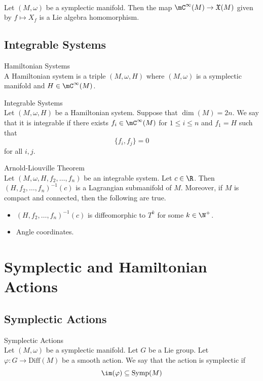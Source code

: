 \documentclass[a4paper]{article}
\begin{document}
\begin{prp}{}{}\\
Let $(M,\omega)$ be a symplectic manifold. Then the map $\mC^\infty(M)\to\mathfrak{X}(M)$ given by $f\mapsto X_f$ is a Lie algebra homomorphism. 
\end{prp}

\subsection{Integrable Systems}
\begin{defn}{Hamiltonian Systems}{}\\
A Hamiltonian system is a triple $(M,\omega,H)$ where $(M,\omega)$ is a symplectic manifold and $H\in\mC^\infty(M)$. 
\end{defn}

\begin{defn}{Integrable Systems}{}\\
Let $(M,\omega,H)$ be a Hamiltonian system. Suppose that $\dim(M)=2n$. We say that it is integrable if there exists $f_i\in\mC^\infty(M)$ for $1\leq i\leq n$ and $f_1=H$ such that $$\{f_i,f_j\}=0$$ for all $i,j$. 
\end{defn}

\begin{thm}{Arnold-Liouville Theorem}{}\\
Let $(M,\omega,H,f_2,\dots,f_n)$ be an integrable system. Let $c\in\R$. Then $(H,f_2,\dots,f_n)^{-1}(c)$ is a Lagrangian submanifold of $M$. Moreover, if $M$ is compact and connected, then the following are true. 
\begin{itemize}
\item $(H,f_2,\dots,f_n)^{-1}(c)$ is diffeomorphic to $T^k$ for some $k\in\N^+$. 
\item Angle coordinates. 
\end{itemize}
\end{thm}

\pagebreak
\section{Symplectic and Hamiltonian Actions}
\subsection{Symplectic Actions}
\begin{defn}{Symplectic Actions}{}\\
Let $(M,\omega)$ be a symplectic manifold. Let $G$ be a Lie group. Let $\varphi:G\to\text{Diff}(M)$ be a smooth action. We say that the action is symplectic if $$\im(\varphi)\subseteq\text{Symp}(M)$$
\end{defn}
\end{document}
